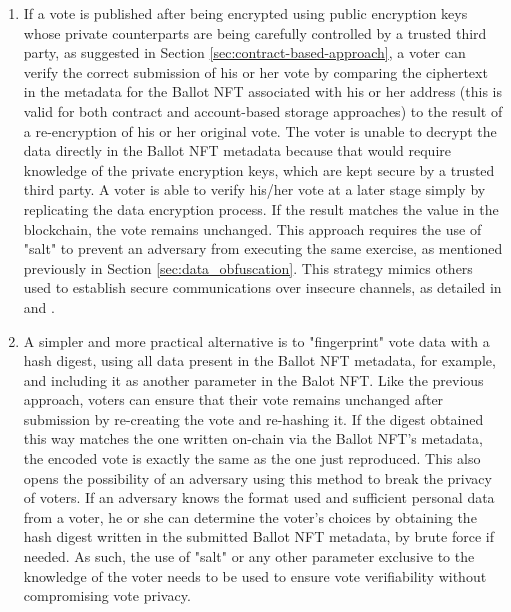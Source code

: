 \documentclass[../main.tex]{subfiles}
\begin{document}
\begin{enumerate}
    \item{If a vote is published after being encrypted using public encryption keys whose private counterparts are being carefully controlled by a trusted third party, as suggested in Section \ref{sec:contract-based-approach}, a voter can verify the correct submission of his or her vote by comparing the ciphertext in the metadata for the Ballot NFT associated with his or her address (this is valid for both contract and account-based storage approaches) to the result of a re-encryption of his or her original vote. The voter is unable to decrypt the data directly in the Ballot NFT metadata because that would require knowledge of the private encryption keys, which are kept secure by a trusted third party. A voter is able to verify his/her vote at a later stage simply by replicating the data encryption process. If the result matches the value in the blockchain, the vote remains unchanged. This approach requires the use of "salt" to prevent an adversary from executing the same exercise, as mentioned previously in Section \ref{sec:data_obfuscation}. This strategy mimics others used to establish secure communications over insecure channels, as detailed in \cite{Merkle1978} and \cite{Merkle1980}}.

    \item{A simpler and more practical alternative is to "fingerprint" vote data with a hash digest, using all data present in the Ballot NFT metadata, for example, and including it as another parameter in the Balot NFT. Like the previous approach, voters can ensure that their vote remains unchanged after submission by re-creating the vote and re-hashing it. If the digest obtained this way matches the one written on-chain via the Ballot NFT's metadata, the encoded vote is exactly the same as the one just reproduced. This also opens the possibility of an adversary using this method to break the privacy of voters. If an adversary knows the format used and sufficient personal data from a voter, he or she can determine the voter's choices by obtaining the hash digest written in the submitted Ballot NFT metadata, by brute force if needed. As such, the use of "salt" or any other parameter exclusive to the knowledge of the voter needs to be used to ensure vote verifiability without compromising vote privacy.}
\end{enumerate}
\end{document}

